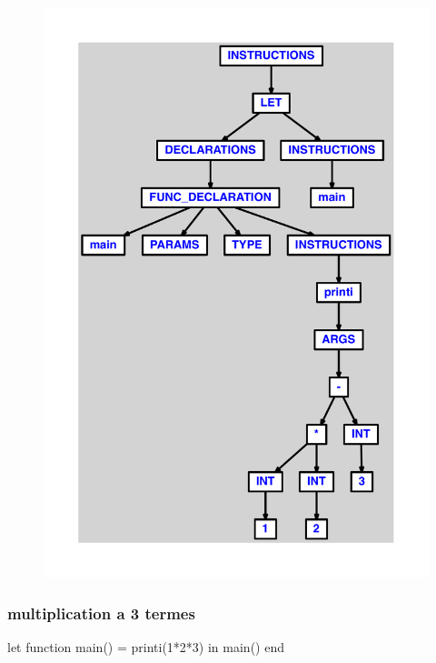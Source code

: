 \documentclass{article}
\begin{document}
\begin{figure}[H]\centering\includegraphics[max width=\textwidth]{ast/ast_48.pdf}\end{figure}\subsubsection{multiplication a 3 termes}
\begin{verbatimtab}
let
	function main() = printi(1*2*3)
in main() end
\end{verbatimtab}
\end{document}
